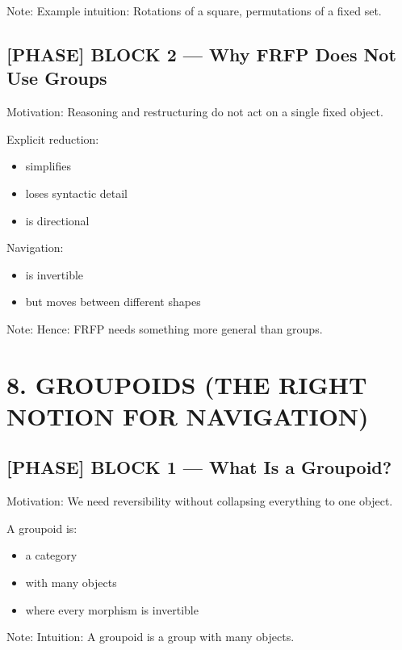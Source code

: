 Note: Example intuition: Rotations of a square, permutations of a fixed set.\par

\subsection*{[PHASE] BLOCK 2 --- Why FRFP Does Not Use Groups}

Motivation: Reasoning and restructuring do not act on a single fixed object.\par

Explicit reduction:\n\n\begin{itemize}\n\item simplifies
\item loses syntactic detail
\item is directional\n\end{itemize}

Navigation:\n\n\begin{itemize}\n\item is invertible
\item but moves between different shapes\n\end{itemize}

Note: Hence: FRFP needs something more general than groups.\par

\section*{8. GROUPOIDS (THE RIGHT NOTION FOR NAVIGATION)}

\subsection*{[PHASE] BLOCK 1 --- What Is a Groupoid?}

Motivation: We need reversibility without collapsing everything to one object.\par

A groupoid is:\n\n\begin{itemize}\n\item a category
\item with many objects
\item where every morphism is invertible\n\end{itemize}

Note: Intuition: A groupoid is a group with many objects. \par

